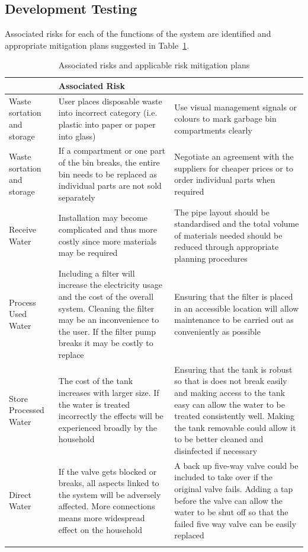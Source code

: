 \documentclass[a4paper,11pt,fleqn]{report}
\begin{document}
\subsection{Development Testing}
Associated risks for each of the functions of the system are identified and appropriate mitigation plans suggested in Table~\ref{tb: Functional_risk_mitigation}.
%
\begin{table}[h!]
\caption {Associated risks and applicable risk mitigation plans} \label{tb: Functional_risk_mitigation} 
\begin{center}
\begin{tabular}{p{3cm}|p{5.5cm}|p{5.5cm}}\toprule
	{\textbf{Function} & \textbf{Associated Risk}} & {\textbf{Risk Mitigation}\\ \midrule
    \hline
    Waste sortation and storage & User places disposable waste into incorrect category (i.e. plastic into paper or paper into glass) & Use visual management signals or colours to mark garbage bin compartments clearly\\
      \hline
    Waste sortation and storage & If a compartment or one part of the bin breaks, the entire bin needs to be replaced as individual parts are not sold separately & Negotiate an agreement with the suppliers for cheaper prices or to order individual parts when required\\
     \hline
     Receive Water & Installation may become complicated and thus more costly since more materials may be required & The pipe layout should be standardised and the total volume of materials needed should be reduced through appropriate planning procedures\\
    \hline
Process Used Water & Including a filter will increase the electricity usage and the cost of the overall system. Cleaning the filter may be an inconvenience to the user. If the filter pump breaks it may be costly to replace & Ensuring that the filter is placed in an accessible location will allow maintenance to be carried out as conveniently as possible\\
    \hline
Store Processed Water & The cost of the tank increases with larger size. If the water is treated incorrectly the effects will be experienced broadly by the household & Ensuring that the tank is robust so that is does not break easily and making access to the tank easy can allow the water to be treated consistently well. Making the tank removable could allow it to be better cleaned and disinfected if necessary\\
    \hline
Direct Water & If the valve gets blocked or breaks, all aspects linked to the system will be adversely affected. More connections means more widespread effect on the household & A back up five-way valve could be included to take over if the original valve fails. Adding a tap before the valve can allow the water to be shut off so that the failed five way valve can be easily replaced\\
}
\end{tabular}
\end{center}
\end{table}
\end{document}
